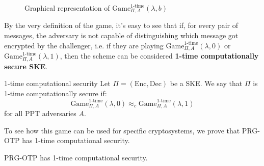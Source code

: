 \documentclass[a4paper, 12pt]{report}
\begin{document}
    \begin{figure}[H]
        \centering


        \caption{Graphical representation of $\mathrm{Game}_{\Pi, A}^{\text{1-time}}(\lambda, b)$}
    \end{figure}

    By the very definition of the game, it's easy to see that if, for every pair of messages, the adversary is not capable of distinguishing which message got encrypted by the challenger, i.e. if they are playing $\mathrm{Game}_{\Pi, A}^{\text{1-time}}(\lambda, 0)$ or $\mathrm{Game}_{\Pi, A}^{\text{1-time}}(\lambda, 1)$, then the scheme can be considered \textbf{1-time computationally secure SKE}.

    \begin{frameddefn}{1-time computational security}
        Let $\Pi = (\mathrm{Enc}, \mathrm{Dec})$ be a SKE. We say that $\Pi$ is 1-time computationally secure if:
        \[\mathrm{Game}_{\Pi, A}^{\text{1-time}}(\lambda, 0) \approx_c \mathrm{Game}_{\Pi, A}^{\text{1-time}}(\lambda, 1)\]
        for all PPT adversaries $A$.
    \end{frameddefn}

    To see how this game can be used for specific cryptosystems, we prove that PRG-OTP has 1-time computational security.

    \begin{framedprop}{}
        PRG-OTP has 1-time computational security.
    \end{framedprop}
\end{document}
